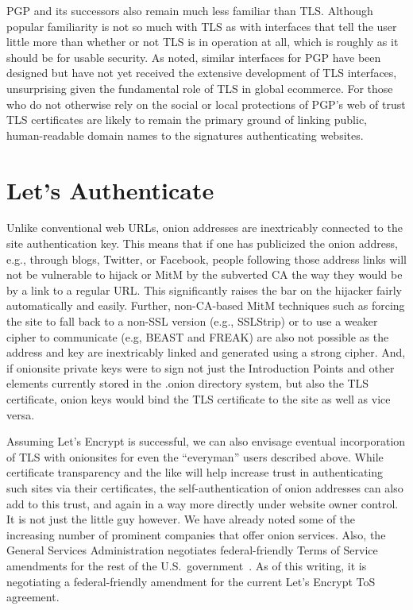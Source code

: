 \documentclass[10pt, conference, compsocconf]{styles/IEEEtran}
\begin{document}
PGP and its successors also remain much less familiar than
TLS. Although popular familiarity is not so much with TLS as with
interfaces that tell the user little more than whether or not TLS is
in operation at all, which is roughly as it should be for usable
security. As noted, similar interfaces for PGP have been designed but
have not yet received the extensive development of TLS interfaces,
unsurprising given the fundamental role of TLS in global ecommerce.
For those who do not otherwise rely on the social or local protections
of PGP's web of trust TLS certificates are likely to remain the
primary ground of linking public, human-readable domain names to the
signatures authenticating websites.



\section{Let's Authenticate}
\label{lets-auth}

Unlike conventional web URLs, onion addresses are inextricably
connected to the site authentication key. This means that if one has
publicized the onion address, e.g., through blogs, Twitter, or
Facebook, people following those address links will not be vulnerable
to hijack or MitM by the subverted CA the way they would be by a link
to a regular URL\@. This significantly raises the bar on the hijacker
fairly automatically and easily. Further, non-CA-based MitM techniques
such as forcing the site to fall back to a non-SSL version (e.g.,
SSLStrip) or to use a weaker cipher to communicate (e.g, BEAST and
FREAK) are also not possible as the address and key are inextricably
linked and generated using a strong cipher. And, if onionsite private
keys were to sign not just the Introduction Points and other elements
currently stored in the .onion directory system, but also the TLS
certificate, onion keys would bind the TLS certificate to the site as
well as vice versa. 

Assuming Let's Encrypt is successful, we can also envisage eventual
incorporation of TLS with onionsites for even the ``everyman'' users
described above.  While certificate transparency and the like will help
increase trust in authenticating such sites via their certificates,
the self-authentication of onion addresses can also add to this trust,
and again in a way more directly under website owner control.  It is
not just the little guy however. We have already noted some of the
increasing number of prominent companies that offer onion
services. Also, the General Services Administration negotiates
federal-friendly Terms of Service amendments for the rest of the U.S.\
government~\cite{gsa-tos}. As of this writing, it is negotiating a
federal-friendly amendment for the current Let's Encrypt ToS
agreement.
\end{document}
